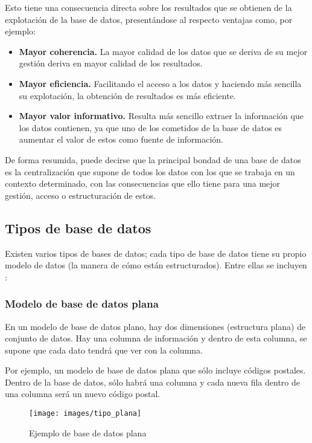 Esto tiene una consecuencia directa sobre los resultados que se obtienen de la explotación de la base de datos, presentándose al respecto ventajas como, por ejemplo:

\begin{itemize}
 \item \textbf{Mayor coherencia.} La mayor calidad de los datos que se deriva de su mejor gestión deriva en mayor calidad de los resultados.
 
 \item \textbf{Mayor eficiencia.} Facilitando el acceso a los datos y haciendo más sencilla su explotación, la obtención de resultados es más eficiente.
 
 \item \textbf{Mayor valor informativo.} Resulta más sencillo extraer la información que los datos contienen, ya que uno de los cometidos de la base de datos es aumentar el valor de estos como fuente de información. 
\end{itemize}

De forma resumida, puede decirse que la principal bondad de una base de datos es la centralización que supone de todos los datos con los que se trabaja en un contexto determinado, con las consecuencias que ello tiene para una mejor gestión, acceso o estructuración de estos.

\subsection*{Tipos de base de datos}

Existen varios tipos de bases de datos; cada tipo de base de datos tiene su propio modelo de datos (la manera de cómo están estructurados). Entre ellas se incluyen \cite{ref4}:

\subsubsection*{Modelo de base de datos plana}

En un modelo de base de datos plano, hay dos dimensiones (estructura plana) de conjunto de datos. Hay una columna de información y dentro de esta columna, se supone que cada dato tendrá que ver con la columna.

Por ejemplo, un modelo de base de datos plana que sólo incluye códigos postales. Dentro de la base de datos, sólo habrá una columna y cada nueva fila dentro de una columna será un nuevo código postal.

\begin{figure}[!h]
	\centering
	\texttt{[image: images/tipo\_plana]}
	\caption{Ejemplo de base de datos plana}
	\label{fig:bd_plana}
\end{figure}

